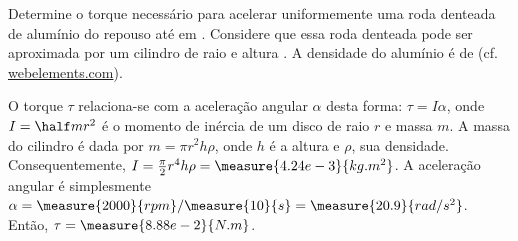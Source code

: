 \begin{question}
    Determine o torque necessário para acelerar uniformemente uma roda denteada de alumínio do repouso até  em .
    Considere que essa roda denteada pode ser aproximada por um cilindro de raio  e altura .
    A densidade do alumínio é de  (cf. \href{https://www.webelements.com/aluminium/}{webelements.com}).

    \begin{answer}
    \end{answer}
    
    \begin{solution}
      O torque $\tau$ relaciona-se com a aceleração angular $\alpha$ desta forma: $\tau = I\alpha$, onde $I = \half mr^2$ é o momento de inércia de um disco de raio $r$ e massa $m$.
      A massa do cilindro é dada por $m = \pi r^2 h \rho$, onde $h$ é a altura e $\rho$, sua densidade.
      Consequentemente, $I = \frac{\pi}{2} r^4 h \rho = \measure{4.24e-3}{kg.m^2}$.
      A aceleração angular é simplesmente $\alpha = \measure{2000}{rpm}/\measure{10}{s} = \measure{20.9}{rad/s^2}$.
      Então, $\tau = \measure{8.88e-2}{N.m}$.
    \end{solution}
\end{question}